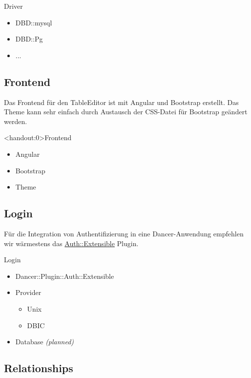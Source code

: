 \begin{frame}[fragile]{Driver}
\begin{itemize}
\item DBD::mysql
\item DBD::Pg
\item ...
\end{itemize}
\end{frame}

\subsection{Frontend}
Das Frontend für den TableEditor ist mit Angular und Bootstrap erstellt.
Das Theme kann sehr einfach durch Austausch der CSS-Datei für Bootstrap
geändert werden.

\begin{frame}<handout:0>{Frontend}
\begin{itemize}
\item Angular
\item Bootstrap
\item Theme
\end{itemize}
\end{frame}

\subsection{Login}

Für die Integration von Authentifizierung in eine Dancer-Anwendung empfehlen
wir wärmestens das
\href{https://metacpan.org/pod/Dancer::Plugin::Auth::Extensible}{Auth::Extensible}
Plugin.

\begin{frame}{Login}
\begin{itemize}
\item Dancer::Plugin::Auth::Extensible
\item Provider
\begin{itemize}
\item Unix
\item DBIC
\end{itemize}
\item Database \textit{(planned)}
\end{itemize}
\end{frame}

\subsection{Relationships}

